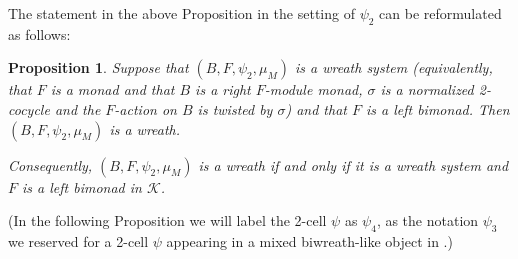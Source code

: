 \documentclass[a4paper, 12pt]{article}
\renewcommand{\_}[1]{\mbox{$_{\left( #1 \right)}$}}
\theoremstyle{plain}
\newtheorem{prop}[thm]{Proposition}
\def\K{{\mathcal K}}  %
\newcommand{\equref}[1]{(\ref{eq:#1})}
\newcommand{\prlabel}[1]{\label{pr:#1}}
\begin{document}
The statement in the above Proposition in the setting of $\psi_2$ can be reformulated as follows: 


\begin{prop} \prlabel{Sw iff}
Suppose that $(B,F, \psi_2, \mu_M)$ is a wreath system (equivalently, that $F$ is a monad and that %
$B$ is a right $F$-module monad, $\sigma$ is a normalized 2-cocycle and the $F$-action on $B$ is twisted by $\sigma$) and that $F$ is a left bimonad. %
Then $(B,F, \psi_2, \mu_M)$ is a wreath. 

Consequently, $(B,F, \psi_2, \mu_M)$ is a wreath if and only if it is a wreath system and $F$ is a left bimonad in $\K$. 
\end{prop}


\bigskip 


(In the following Proposition we will label the 2-cell $\psi$ as $\psi_4$, as the notation $\psi_3$ we reserved for a 2-cell $\psi$ appearing in a mixed biwreath-like object in \cite{Femic5}.) 
\end{document}
